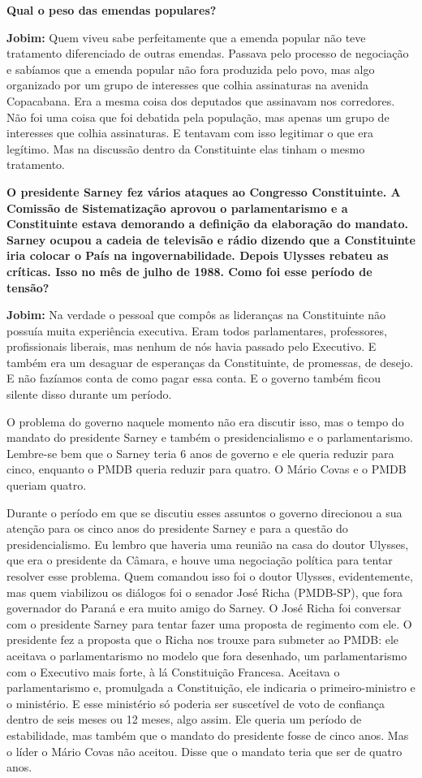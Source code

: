 \textbf{Qual o peso das emendas populares?}

\textbf{Jobim:} Quem viveu sabe perfeitamente que a emenda popular não
teve tratamento diferenciado de outras emendas. Passava pelo processo de
negociação e sabíamos que a emenda popular não fora produzida pelo povo,
mas algo organizado por um grupo de interesses que colhia assinaturas na
avenida Copacabana. Era a mesma coisa dos deputados que assinavam nos
corredores. Não foi uma coisa que foi debatida pela população, mas
apenas um grupo de interesses que colhia assinaturas. E tentavam com
isso legitimar o que era legítimo. Mas na discussão dentro da
Constituinte elas tinham o mesmo tratamento.

\textbf{O presidente Sarney fez vários ataques ao Congresso
Constituinte. A Comissão de Sistematização aprovou o parlamentarismo e a
Constituinte estava demorando a definição da elaboração do mandato.
Sarney ocupou a cadeia de televisão e rádio dizendo que a Constituinte
iria colocar o País na ingovernabilidade. Depois Ulysses rebateu as
críticas. Isso no mês de julho de 1988. Como foi esse período de
tensão?}

\textbf{Jobim:} Na verdade o pessoal que compôs as lideranças na
Constituinte não possuía muita experiência executiva. Eram todos
parlamentares, professores, profissionais liberais, mas nenhum de nós
havia passado pelo Executivo. E também era um desaguar de esperanças da
Constituinte, de promessas, de desejo. E não fazíamos conta de como
pagar essa conta. E o governo também ficou silente disso durante um
período.

O problema do governo naquele momento não era discutir isso, mas o tempo
do mandato do presidente Sarney e também o presidencialismo e o
parlamentarismo. Lembre-se bem que o Sarney teria 6 anos de governo e
ele queria reduzir para cinco, enquanto o PMDB queria reduzir para
quatro. O Mário Covas e o PMDB queriam quatro.

Durante o período em que se discutiu esses assuntos o governo direcionou
a sua atenção para os cinco anos do presidente Sarney e para a questão
do presidencialismo. Eu lembro que haveria uma reunião na casa do doutor
Ulysses, que era o presidente da Câmara, e houve uma negociação política
para tentar resolver esse problema. Quem comandou isso foi o doutor
Ulysses, evidentemente, mas quem viabilizou os diálogos foi o senador
José Richa (PMDB-SP), que fora governador do Paraná e era muito amigo do
Sarney. O José Richa foi conversar com o presidente Sarney para tentar
fazer uma proposta de regimento com ele. O presidente fez a proposta que
o Richa nos trouxe para submeter ao PMDB: ele aceitava o parlamentarismo
no modelo que fora desenhado, um parlamentarismo com o Executivo mais
forte, à lá Constituição Francesa. Aceitava o parlamentarismo e,
promulgada a Constituição, ele indicaria o primeiro-ministro e o
ministério. E esse ministério só poderia ser suscetível de voto de
confiança dentro de seis meses ou 12 meses, algo assim. Ele queria um
período de estabilidade, mas também que o mandato do presidente fosse de
cinco anos. Mas o líder o Mário Covas não aceitou. Disse que o mandato
teria que ser de quatro anos.

